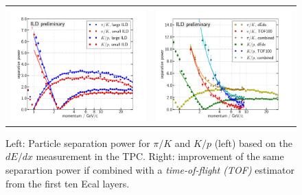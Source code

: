 %
% 
\begin{figure}[b!]
\begin{tabular}{cc}
\includegraphics[width=0.5\hsize]{Performance/fig/dEdx_ILDls_separation_power.pdf} &
\includegraphics[width=0.5\hsize]{Performance/fig/Combined_dEdx_TOF100.pdf}
\end{tabular}
\caption{\label{fig:perf:trkeff_jer_dedx} Left: Particle separation power for $\pi/K$ and $K/p$ (left) based on the $dE/dx$ measurement in the TPC.
Right: improvement of the same separartion power if combined with a {\em time-of-flight (TOF)} estimator from the first ten Ecal layers.}
 \end{figure}

